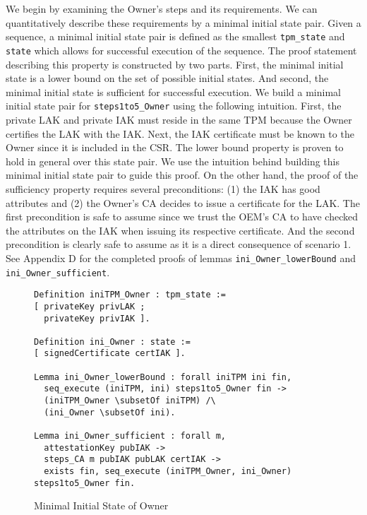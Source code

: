 We begin by examining the Owner's steps and its requirements. We can quantitatively describe these requirements by a minimal initial state pair. Given a sequence, a minimal initial state pair is defined as the smallest \verb|tpm_state| and \verb|state| which allows for successful execution of the sequence. The proof statement describing this property is constructed by two parts. First, the minimal initial state is a lower bound on the set of possible initial states. And second, the minimal initial state is sufficient for successful execution. We build a minimal initial state pair for \verb|steps1to5_Owner| using the following intuition. First, the private LAK and private IAK must reside in the same TPM because the Owner certifies the LAK with the IAK. Next, the IAK certificate must be known to the Owner since it is included in the CSR.  
The lower bound property is proven to hold in general over this state pair. We use the intuition behind building this minimal initial state pair to guide this proof. On the other hand, the proof of the sufficiency property requires several preconditions: (1) the IAK has good attributes and (2) the Owner's CA decides to issue a certificate for the LAK. 
The first precondition is safe to assume since we trust the OEM's CA to have checked the attributes on the IAK when issuing its respective certificate. And the second precondition is clearly safe to assume as it is a direct consequence of scenario 1. See Appendix D for the completed proofs of lemmas \verb|ini_Owner_lowerBound| and \verb|ini_Owner_sufficient|.
\begin{figure}[h]
\begin{lstlisting}[language=Coq]
Definition iniTPM_Owner : tpm_state :=
[ privateKey privLAK ;
  privateKey privIAK ].

Definition ini_Owner : state :=
[ signedCertificate certIAK ].

Lemma ini_Owner_lowerBound : forall iniTPM ini fin,
  seq_execute (iniTPM, ini) steps1to5_Owner fin ->
  (iniTPM_Owner \subsetOf iniTPM) /\
  (ini_Owner \subsetOf ini).

Lemma ini_Owner_sufficient : forall m,
  attestationKey pubIAK ->
  steps_CA m pubIAK pubLAK certIAK ->
  exists fin, seq_execute (iniTPM_Owner, ini_Owner) steps1to5_Owner fin.
\end{lstlisting}
\caption{Minimal Initial State of Owner}
\end{figure}
